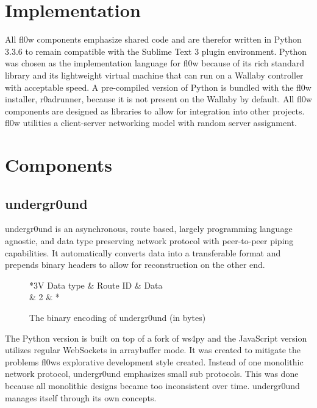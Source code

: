 \documentclass[conference]{IEEEtran}
\begin{document}
\section{Implementation}
All fl0w components emphasize shared code and are therefor written in Python 3.3.6\cite{Python 3.3.6:Python Foundation} to remain compatible with the Sublime Text 3\cite{Sublime Text 3:Sublime HQ} plugin environment. Python was chosen as the implementation language for fl0w because of its rich standard library and its lightweight virtual machine that can run on a Wallaby controller with acceptable speed. A pre-compiled version of Python \cite{Python 3.3.6:Python Foundation} is bundled with the fl0w installer, r0adrunner, because it is not present on the Wallaby by default. All fl0w components are designed as libraries to allow for integration into other projects. fl0w utilities a client-server networking model with random server assignment.

\section{Components}

\subsection{undergr0und}
undergr0und\cite{undergr0und:Philip Trauner} is an asynchronous, route based, largely programming language agnostic, and data type preserving network protocol with peer-to-peer piping capabilities.
It automatically converts data into a transferable format and prepends binary headers to allow for reconstruction on the other end.

\begin{figure}[H]
\centering
	\begin{tabular}{*{3}{V}}
		Data type & Route ID & Data \\  & 2 & * \\
	\end{tabular}
	\caption{The binary encoding of undergr0und (in bytes)}
\label{fig:undergr0und_header}
\end{figure}


The Python\cite{Python 3.3.6:Python Foundation} version is built on top of a fork of ws4py\cite{ws4py:Philip Trauner} and the JavaScript version utilizes regular WebSockets\cite{The WebSocket Protocol:A. Melnikov} in arraybuffer mode. It was created to mitigate the problems fl0ws explorative development style created. Instead of one monolithic network protocol, undergr0und emphasizes small sub protocols. This was done because all monolithic designs became too inconsistent over time. undergr0und\cite{undergr0und:Philip Trauner} manages itself through its own concepts.
\end{document}
